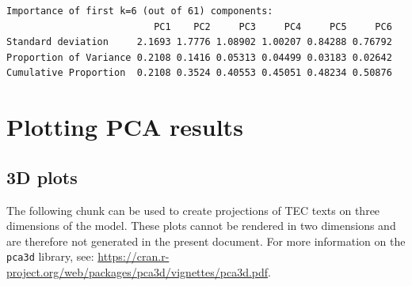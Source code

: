 \documentclass[
  letterpaper,
  DIV=11,
  numbers=noendperiod]{scrreprt}
\begin{document}
\begin{verbatim}
Importance of first k=6 (out of 61) components:
                          PC1    PC2     PC3     PC4     PC5     PC6
Standard deviation     2.1693 1.7776 1.08902 1.00207 0.84288 0.76792
Proportion of Variance 0.2108 0.1416 0.05313 0.04499 0.03183 0.02642
Cumulative Proportion  0.2108 0.3524 0.40553 0.45051 0.48234 0.50876
\end{verbatim}

\section{Plotting PCA results}\label{plotting-pca-results}

\subsection{3D plots}\label{d-plots}

The following chunk can be used to create projections of TEC texts on
three dimensions of the model. These plots cannot be rendered in two
dimensions and are therefore not generated in the present document. For
more information on the \texttt{pca3d} library, see:
\url{https://cran.r-project.org/web/packages/pca3d/vignettes/pca3d.pdf}.
\end{document}

